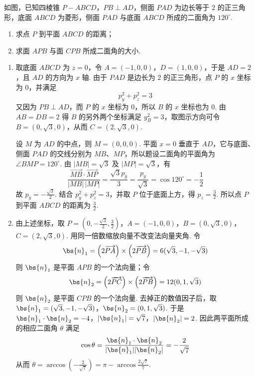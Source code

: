 \begin{problem}
如图，已知四棱锥 \(P - ABCD\)，\(PB \perp AD\)，侧面 \(PAD\) 为边长等于 \(2\) 的正三角形，底面 \(ABCD\) 为菱形，侧面 \(PAD\) 与底面 \(ABCD\) 所成的二面角为 \(120^{\circ}\).



\begin{enumerate}
\item 求点 \(P\) 到平面 \(ABCD\) 的距离；
\item 求面 \(APB\) 与面 \(CPB\) 所成二面角的大小.
\end{enumerate}

\end{problem}

\begin{solution}
\begin{enumerate}
\item 取底面 \(ABCD\) 为 \(z=0\)，令 \(A=(-1,0,0)\)，\(D=(1,0,0)\)，于是 \(AD=2\)，且 \(AD\) 的方向为 \(x\) 轴. 由于 \(PAD\) 是边长为 \(2\) 的正三角形，点 \(P\) 的 \(x\) 坐标为 \(0\)，并满足
\[
p_y^2+p_z^2=3
\]
又因为 \(PB\perp AD\)，而 \(P\) 的 \(x\) 坐标为 \(0\)，所以 \(B\) 的 \(x\) 坐标也为 \(0\). 由 \(AB=DB=2\) 得 \(B\) 的另外两个坐标满足 \(y_B^2=3\)，取图示方向可令 \(B=(0,\sqrt3,0)\)，从而 \(C=(2,\sqrt3,0)\).

设 \(M\) 为 \(AD\) 的中点，则 \(M=(0,0,0)\). 平面 \(x=0\) 垂直于 \(AD\)，它与底面、侧面 \(PAD\) 的交线分别为 \(MB\)、\(MP\)，所以题设二面角的平面角为 \(\angle BMP=120^{\circ}\). 由 \(|MB|=\sqrt3\) 及 \(|MP|=\sqrt3\)，有
\[
\frac{\overrightarrow{MB}\cdot\overrightarrow{MP}}{|MB|\,|MP|}=\frac{\sqrt3p_y}{3}=\frac{p_y}{\sqrt3}=\cos120^{\circ}=-\frac12
\]
故 \(p_y=-\frac{\sqrt3}{2}\). 结合 \(p_y^2+p_z^2=3\)，并取 \(P\) 位于底面上方，得 \(p_z=\frac32\). 所以点 \(P\) 到平面 \(ABCD\) 的距离为 \(\frac32\).

\item 由上述坐标，取 \(P=\left(0,-\frac{\sqrt3}{2},\frac32\right)\)，\(A=(-1,0,0)\)，\(B=(0,\sqrt3,0)\)，\(C=(2,\sqrt3,0)\).
用同一倍数缩放向量不改变法向量夹角. 令
\[
\bs{n}_1=\left(2\overrightarrow{PA}\right)\times\left(2\overrightarrow{PB}\right)=6(\sqrt3,-1,-\sqrt3)
\]
则 \(\bs{n}_1\) 是平面 \(APB\) 的一个法向量；令
\[
\bs{n}_2=\left(2\overrightarrow{PC}\right)\times\left(2\overrightarrow{PB}\right)=12(0,1,\sqrt3)
\]
则 \(\bs{n}_2\) 是平面 \(CPB\) 的一个法向量. 去掉正的数值因子后，取 \(\bs{n}_1=(\sqrt3,-1,-\sqrt3)\)，\(\bs{n}_2=(0,1,\sqrt3)\).
于是 \(\bs{n}_1\cdot\bs{n}_2=-4\)，\(\lvert\bs{n}_1\rvert=\sqrt7\)，\(\lvert\bs{n}_2\rvert=2\).
因此两平面所成的相应二面角 \(\theta\) 满足
\[
\cos\theta=\frac{\bs{n}_1\cdot\bs{n}_2}{\lvert\bs{n}_1\rvert\lvert\bs{n}_2\rvert}=-\frac{2}{\sqrt7}
\]
从而 \(\theta=\arccos\left(-\frac{2}{\sqrt7}\right)=\pi-\arccos\frac{2\sqrt7}{7}\).
\end{enumerate}
\end{solution}

